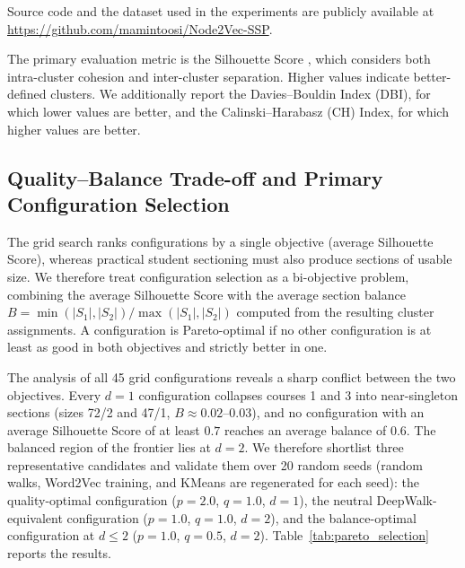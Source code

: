 \documentclass[pdflatex,sn-mathphys-num,iicol]{sn-jnl}%
\theoremstyle{thmstyleone}%
\theoremstyle{thmstyletwo}%
\theoremstyle{thmstylethree}%
\begin{document}
Source code and the dataset used in the experiments are publicly available at \url{https://github.com/mamintoosi/Node2Vec-SSP}.

The primary evaluation metric is the Silhouette Score \cite{zaki2020data}, which considers both intra-cluster cohesion and inter-cluster separation. Higher values indicate better-defined clusters. We additionally report the Davies--Bouldin Index (DBI), for which lower values are better, and the Calinski--Harabasz (CH) Index, for which higher values are better.

\subsection{Quality--Balance Trade-off and Primary Configuration Selection}
\label{sec:pareto}

The grid search ranks configurations by a single objective (average Silhouette Score), whereas practical student sectioning must also produce sections of usable size. We therefore treat configuration selection as a bi-objective problem, combining the average Silhouette Score with the average section balance $B = \min(|S_1|,|S_2|)/\max(|S_1|,|S_2|)$ computed from the resulting cluster assignments. A configuration is Pareto-optimal if no other configuration is at least as good in both objectives and strictly better in one.

The analysis of all 45 grid configurations reveals a sharp conflict between the two objectives. Every $d=1$ configuration collapses courses 1 and 3 into near-singleton sections (sizes 72/2 and 47/1, $B \approx 0.02$--$0.03$), and no configuration with an average Silhouette Score of at least $0.7$ reaches an average balance of $0.6$. The balanced region of the frontier lies at $d=2$. We therefore shortlist three representative candidates and validate them over 20 random seeds (random walks, Word2Vec training, and KMeans are regenerated for each seed): the quality-optimal configuration ($p=2.0$, $q=1.0$, $d=1$), the neutral DeepWalk-equivalent configuration ($p=1.0$, $q=1.0$, $d=2$), and the balance-optimal configuration at $d \le 2$ ($p=1.0$, $q=0.5$, $d=2$). Table~\ref{tab:pareto_selection} reports the results.
\end{document}
